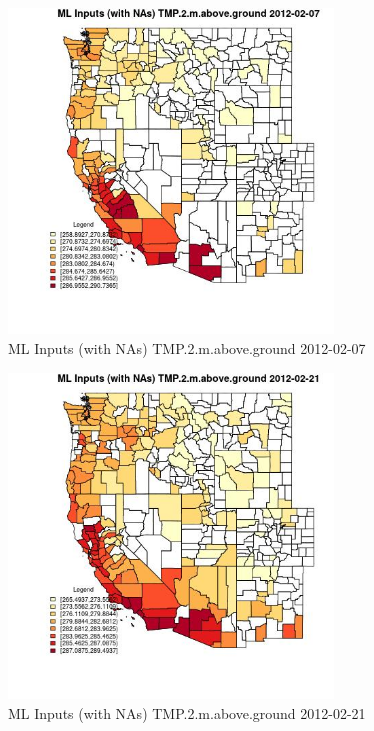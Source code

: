 \begin{figure} 
\centering  
\includegraphics[width=0.77\textwidth]{Code_Outputs/Report_ML_input_PM25_Step4_part_f_de_duplicated_aveswNAs_CountyTMP2mabovegroundMean2012-02-07.jpg} 
\caption{\label{fig:Report_ML_input_PM25_Step4_part_f_de_duplicated_aveswNAsCountyTMP2mabovegroundMean2012-02-07}ML Inputs (with NAs) TMP.2.m.above.ground 2012-02-07} 
\end{figure} 
 

\begin{figure} 
\centering  
\includegraphics[width=0.77\textwidth]{Code_Outputs/Report_ML_input_PM25_Step4_part_f_de_duplicated_aveswNAs_CountyTMP2mabovegroundMean2012-02-21.jpg} 
\caption{\label{fig:Report_ML_input_PM25_Step4_part_f_de_duplicated_aveswNAsCountyTMP2mabovegroundMean2012-02-21}ML Inputs (with NAs) TMP.2.m.above.ground 2012-02-21} 
\end{figure} 
 

